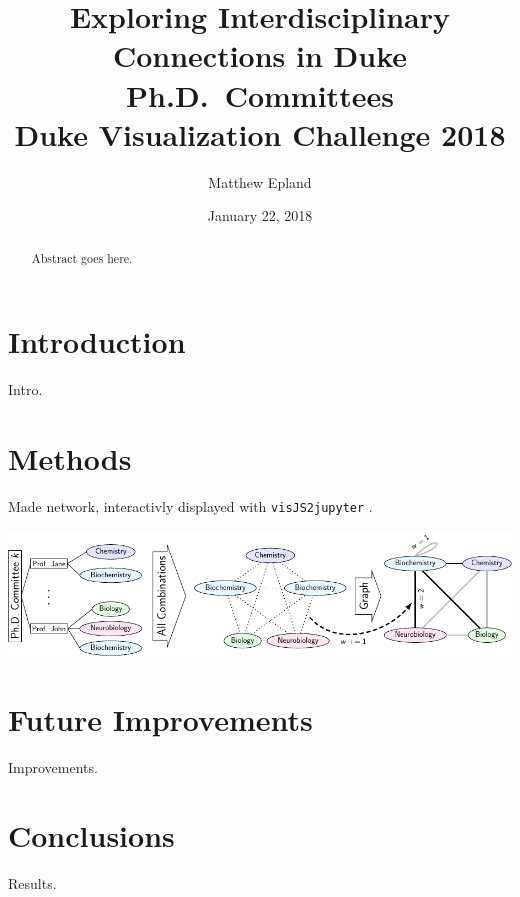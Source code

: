 \documentclass[notitlepage,aps,prd,nofootinbib]{revtex4-1}
\newcommand{\includedir}{../latex_files}
\begin{document}
\title{Exploring Interdisciplinary Connections in Duke Ph.D.\ Committees\\Duke Visualization Challenge 2018}
\author{Matthew\,\,Epland}
\date{January 22, 2018}


\begin{abstract}
Abstract goes here.
\end{abstract}

\maketitle

\section{Introduction}
Intro.

\section{Methods}
Made network, interactivly displayed with \texttt{visJS2jupyter} \cite{visJS2jupyter}.

\includegraphics[width=\textwidth]{../poster/tikzout/vis_challenge_2018_poster-matthew_epland-figure0.pdf}

\section{Future Improvements}
Improvements.

\section{Conclusions}
Results.





\end{document}
